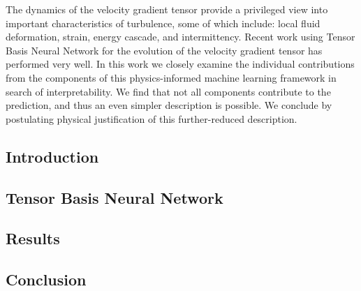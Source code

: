 The dynamics of the velocity gradient tensor provide a privileged view into important characteristics of turbulence, some of which include: local fluid deformation, strain, energy cascade, and intermittency. Recent work using Tensor Basis Neural Network for the evolution of the velocity gradient tensor has performed very well. In this work we closely examine the individual contributions from the components of this physics-informed machine learning framework in search of interpretability. We find that not all components contribute to the prediction, and thus an even simpler description is possible. We conclude by postulating physical justification of this further-reduced description.

\subsection{Introduction}


\subsection{Tensor Basis Neural Network}


\subsection{Results}


\subsection{Conclusion}

